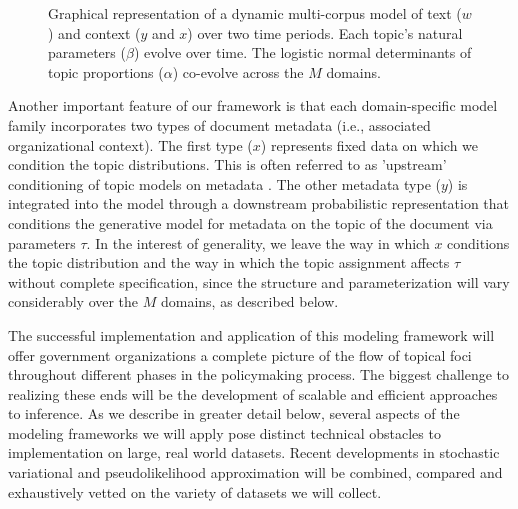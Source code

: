 \begin{figure}
\begin{center}
\end{center}
\vspace{-.3cm}
\caption{Graphical representation of a dynamic multi-corpus model of text ($w$) and context ($y$ and $x$) over two time periods. Each topic's natural parameters ($\beta$) evolve over time. The logistic normal determinants of topic proportions ($\alpha$) co-evolve across the $M$ domains.}
\vspace{-.15cm}

\label{plates}


\end{figure}


Another important feature of our framework is that each
domain-specific model family incorporates two types of document metadata (i.e., associated organizational context). The first type ($x$) represents fixed data on which we condition the topic distributions. This is often referred to as 'upstream' conditioning of topic models on metadata \cite{Mimno2012,Mimno2008}. The other metadata type ($y$) is integrated into the model through a downstream probabilistic representation that conditions the generative model for metadata on the topic of the document via parameters $\tau$. In the interest of generality, we leave the way in which $x$ conditions the topic distribution and the way in which the topic assignment affects $\tau$  without complete
specification, since the structure and parameterization
will vary considerably over the $M$ domains, as described below. \vspace{.1cm}

The successful implementation and application of this modeling framework will offer government organizations a complete picture of the flow of topical foci throughout different phases in the policymaking process. The biggest challenge to realizing these ends will be the development of scalable and efficient approaches to inference. As we describe in greater detail below, several aspects of the modeling frameworks we will apply pose distinct technical obstacles to implementation on large, real world datasets. Recent developments in stochastic variational \cite{Hoffman2010,Mimno2012b,Gopalan2012} and pseudolikelihood approximation \cite{Sutton2007,Desmarais2010} will be combined, compared and exhaustively vetted on the variety of datasets we will collect.




